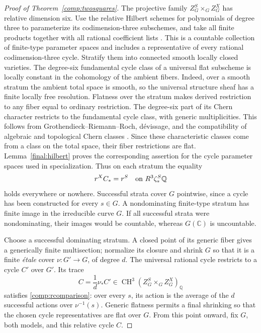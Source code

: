 \documentclass[11pt]{amsart}
\newcommand{\Q}{\mathbb Q}
\newcommand{\C}{\mathbb C}
\DeclareMathOperator{\CH}{CH}
\theoremstyle{definition}
\theoremstyle{remark}
\numberwithin{equation}{section}
\begin{document}
\begin{proof}[Proof of Theorem~\ref{comp:twosquares}]
The projective family $Z^S_G\times_G Z^X_G$ has relative dimension six.
Use the relative Hilbert schemes for polynomials of degree three to
parameterize its codimension-three subschemes, and take all finite
products together with all rational coefficient lists
\cite[Theorem~3.2]{GrothendieckHilbert}.
This is a countable collection of finite-type parameter spaces and
includes a representative of every rational codimension-three cycle.
Stratify them into connected smooth locally closed varieties.
The degree-six fundamental cycle class of a universal flat subscheme
is locally constant in the cohomology of the ambient fibers.
Indeed, over a smooth stratum the ambient total space is smooth, so
the universal structure sheaf has a finite locally free resolution.
Flatness over the stratum makes derived restriction to any fiber equal
to ordinary restriction.  The degree-six part of its Chern character
restricts to the fundamental cycle class, with generic multiplicities.
This follows from Grothendieck--Riemann--Roch, d\'evissage, and
the compatibility of algebraic and topological Chern classes
\cite[Theorem~15.2, Example~15.2.16\textup{(a)}, and Proposition~19.1.2]{Fulton}.  Since these
characteristic classes come
from a class on the total space, their fiber restrictions are flat.
Lemma~\ref{final:hilbert} proves the corresponding assertion for the
cycle parameter spaces used in specialization.  Thus on each stratum
the equality
\begin{equation}\label{comp:rcomparison}
 r^X C_*=r^S\quad\hbox{on }R^3\zeta^S_*\Q
\end{equation}
holds everywhere or nowhere.  Successful strata cover $G$ pointwise,
since a cycle has been constructed for every $s\in G$.  A
nondominating finite-type stratum has finite image in the irreducible
curve $G$.  If all successful strata were nondominating, their images
would be countable, whereas $G(\C)$ is uncountable.

Choose a successful dominating stratum.  A closed point of its generic
fiber gives a generically finite multisection; normalize its closure
and shrink $G$ so that it is a finite \emph{\'etale} cover
$\nu:G'\to G$, of degree $d$.  The universal rational cycle restricts
to a cycle $C'$ over $G'$.  Its trace
\begin{equation}\label{comp:relativeC}
 C=\frac1d\nu_*C'
 \in\CH^3(Z^S_G\times_GZ^X_G)_\Q
\end{equation}
satisfies \eqref{comp:rcomparison}: over every $s$, its action is the
average of the $d$ successful actions over $\nu^{-1}(s)$.
Generic flatness permits a final shrinking so that the chosen cycle
representatives are flat over $G$.  From this point onward, fix $G$,
both models, and this relative cycle $C$.


\end{proof}
\end{document}
